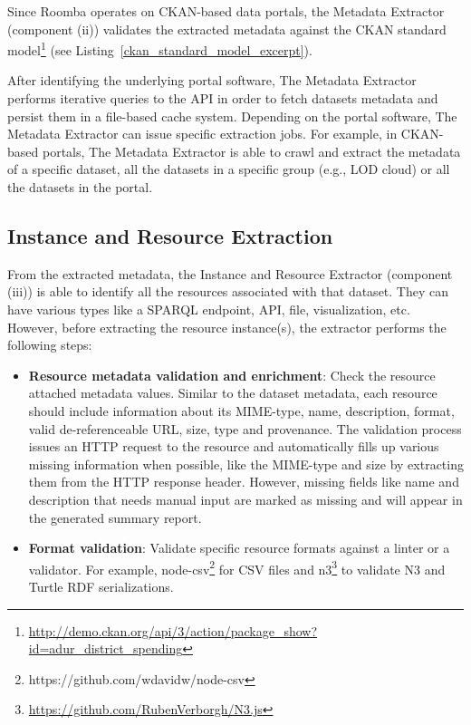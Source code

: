 Since Roomba operates on CKAN-based data portals, the Metadata Extractor (component (ii)) validates the extracted metadata against the CKAN standard model\footnote{\url{http://demo.ckan.org/api/3/action/package\_show?id=adur\_district\_spending}} (see Listing~\ref{ckan_standard_model_excerpt}).



After identifying the underlying portal software, The Metadata Extractor performs iterative queries to the API in order to fetch datasets metadata and persist them in a file-based cache system. Depending on the portal software, The Metadata Extractor can issue specific extraction jobs. For example, in CKAN-based portals, The Metadata Extractor is able to crawl and extract the metadata of a specific dataset, all the datasets in a specific group (e.g., LOD cloud) or all the datasets in the portal.

\subsection{Instance and Resource Extraction}
From the extracted metadata, the Instance and Resource Extractor (component (iii)) is able to identify all the resources associated with that dataset. They can have various types like a SPARQL endpoint, API, file, visualization, etc. However, before extracting the resource instance(s), the extractor performs the following steps:
\begin{itemize}
  \item \textbf{Resource metadata validation and enrichment}: Check the resource attached metadata values. Similar to the dataset metadata, each resource should include information about its MIME-type, name, description, format, valid de-referenceable URL, size, type and provenance. The validation process issues an HTTP request to the resource and automatically fills up various missing information when possible, like the MIME-type and size by extracting them from the HTTP response header. However, missing fields like name and description that needs manual input are marked as missing and will appear in the generated summary report.
  \item \textbf{Format validation}: Validate specific resource formats against a linter or a validator. For example, node-csv\footnote{https://github.com/wdavidw/node-csv} for CSV files and n3\footnote{\url{https://github.com/RubenVerborgh/N3.js}} to validate N3 and Turtle RDF serializations.
\end{itemize}

